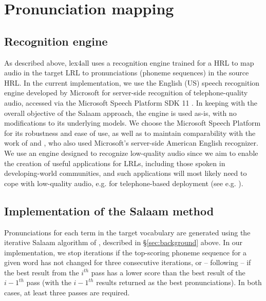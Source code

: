 \documentclass[11pt]{article}
\begin{document}
\section{Pronunciation mapping}
\label{sec:backend}

\subsection{Recognition engine}
\label{sec:engine}
As described above, lex4all uses a recognition engine trained for a HRL to map audio in the target LRL to pronunciations (phoneme sequences) in the source HRL. 
In the current implementation, we use the English (US) speech recognition engine developed by Microsoft for server-side recognition of telephone-quality audio, accessed via the Microsoft Speech Platform SDK 11 \cite{mspsdk}. 
In keeping with the overall objective of the Salaam approach, the engine is used as-is, with no modifications to its underlying models. 
We choose the Microsoft Speech Platform for its robustness and ease of use, as well as to maintain comparability with the work of  and , who also used Microsoft's server-side American English recognizer. 
We use an engine designed to recognize low-quality audio since we aim to enable the creation of useful applications for LRLs, including those spoken in developing-world communities, and such applications will most likely need to cope with low-quality audio, e.g. for telephone-based deployment (see e.g. ).



\subsection{Implementation of the Salaam method}
\label{sec:implementation}

Pronunciations for each term in the target vocabulary are generated using the iterative Salaam algorithm of , described in \S\ref{sec:background} above. In our implementation, 
we stop iterations
if the top-scoring phoneme sequence for a given word has not changed for three consecutive iterations, or -- following  --  if the best result from the $i^{th}$ pass has a lower score than the best result of the ${i - 1}^{th}$ pass (with the ${i - 1}^{th}$ results returned as the best pronunciations). In both cases, at least three passes are required. 
\end{document}

